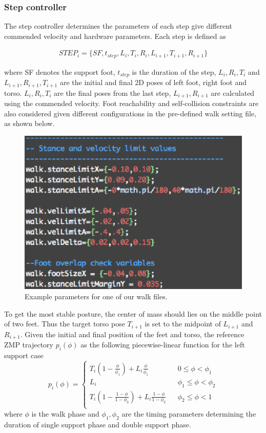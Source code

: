 \documentclass{article}
\begin{document}
\subsubsection{Step controller}
	The step controller determines the parameters of each step give different commended velocity and hardware parameters. Each step is defined as 

	\begin{eqnarray*}
		STEP_i=\{SF,t_{step},L_i,T_i,R_i,L_{i+1},T_{i+1},R_{i+1}\}
	\end{eqnarray*}
	
	where SF denotes the support foot, $t_{step}$ is the duration of the step, $L_i,R_i,T_i$ and $L_{i+1},R_{i+1},T_{i+1}$ are the initial and final 2D poses of left foot, right foot and torso. $L_i,R_i,T_i$ are the final poses from the last step, $L_{i+1},R_{i+1}$ are calculated using the commended velocity. Foot reachability and self-collision constraints are also considered given different configurations in the pre-defined walk setting file, as shown below.

	\begin{figure}[H]
		\centering
		\includegraphics[width=.60\textwidth]{figures/WalkFile.eps}
		\caption{Example parameters for one of our walk files.}
	\end{figure}

	To get the most stable posture, the center of mass should lies on the middle point of two feet. Thus the target torso pose $T_{i+1}$ is set to the midpoint of $L_{i+1}$ and $R_{i+1}$.
Given the initial and final position of the feet and torso, the reference ZMP trajectory $p_i(\phi)$ as the following piecewise-linear function for the left support case
$$ p_i(\phi)=\left\{
\begin{array}{rcl}
T_i(1-\frac{\phi}{\phi_1})+L_i \frac{\phi}{\phi_1} & & 0 \leq \phi < \phi_1\\
L_i & & \phi_1 \leq \phi < \phi_2\\
T_i(1-\frac{1-\phi}{1-\phi_2})+L_i \frac{1-\phi}{1-\phi_2} & & \phi_2 \leq \phi < 1\\
\end{array} \right. $$
where $\phi$ is the walk phase and $\phi_1,\phi_2$ are the timing parameters determining the duration of single support phase and double support phase.
\end{document}
